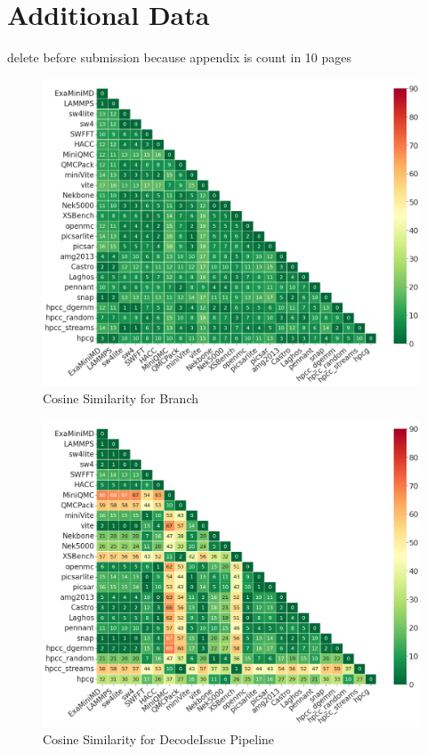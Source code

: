 \appendix
\appendixpage
\section{Additional Data}
\label{appendix:moreData}
\si{delete before submission because appendix is count in 10 pages }
\begin{figure}[ht]
\centering
\includegraphics[width=0.9\linewidth]{figs/Branch.png}
\caption{Cosine Similarity for Branch }
\label{figs:cosine Branch}
\end{figure} 

\begin{figure}[ht]
\centering
\includegraphics[width=0.9\linewidth]{figs/DecodeIssue_Pipeline.png}
\caption{Cosine Similarity for DecodeIssue Pipeline }
\label{figs:cosine DecodeIssue_Pipeline}
\end{figure}

